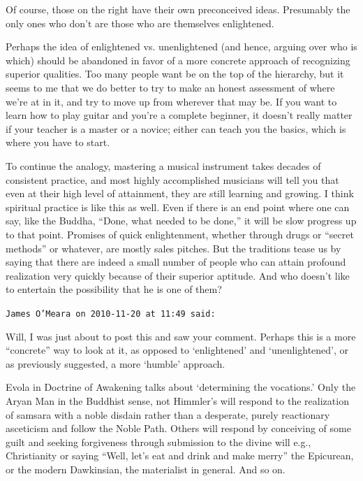 \begin{footnotesize}
\begin{sffamily}
Of course, those on the right have their own preconceived ideas. Presumably the only ones who don't are those who are themselves enlightened.

Perhaps the idea of enlightened vs. unenlightened (and hence, arguing over who is which) should be abandoned in favor of a more concrete approach of recognizing superior qualities. Too many people want be on the top of the hierarchy, but it seems to me that we do better to try to make an honest assessment of where we're at in it, and try to move up from wherever that may be. If you want to learn how to play guitar and you're a complete beginner, it doesn't really matter if your teacher is a master or a novice; either can teach you the basics, which is where you have to start.

To continue the analogy, mastering a musical instrument takes decades of consistent practice, and most highly accomplished musicians will tell you that even at their high level of attainment, they are still learning and growing. I think spiritual practice is like this as well. Even if there is an end point where one can say, like the Buddha, ``Done, what needed to be done,'' it will be slow progress up to that point. Promises of quick enlightenment, whether through drugs or ``secret methods'' or whatever, are mostly sales pitches. But the traditions tease us by saying that there are indeed a small number of people who can attain profound realization very quickly because of their superior aptitude. And who doesn't like to entertain the possibility that he is one of them?

\hfill

\texttt{James O'Meara on 2010-11-20 at 11:49 said:}

Will, I was just about to post this and saw your comment. Perhaps this is a more ``concrete'' way to look at it, as opposed to `enlightened' and `unenlightened', or as previously suggested, a more `humble' approach.

Evola in Doctrine of Awakening talks about `determining the vocations.' Only the Aryan Man in the Buddhist sense, not Himmler's will respond to the realization of samsara with a noble disdain rather than a desperate, purely reactionary asceticism and follow the Noble Path. Others will respond by conceiving of some guilt and seeking forgiveness through submission to the divine will e.g., Christianity or saying ``Well, let's eat and drink and make merry'' the Epicurean, or the modern Dawkinsian, the materialist in general. And so on.


\end{sffamily}
\end{footnotesize}
